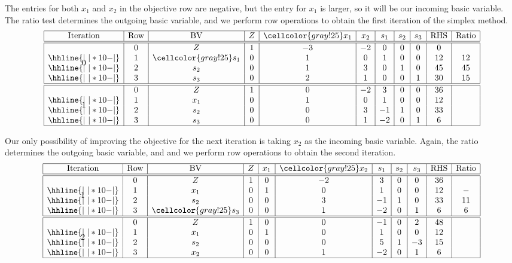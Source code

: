\documentclass[12pt]{article}
\theoremstyle{definition}
\begin{document}
The entries for both $x_1$ and $x_2$ in the objective row are negative, but the entry for $x_1$ is larger, so it will be our incoming basic variable. The ratio test determines the outgoing basic variable, and we perform row operations to obtain the first iteration of the simplex method.
\[\begin{array}{*{11}{|c}|}
    \hline
    \text{Iteration} & \text{Row} & \text{BV} & Z & \cellcolor{gray!25} x_1 & x_2 & s_1 & s_2 & s_3 & \text{RHS} & \text{Ratio} \\\hline\hline
    \multirow{4}*{0}
    & 0 & Z   & 1 & -3 & -2 & 0 & 0 & 0 & 0  &    \\\hhline{|~|*{10}{-}|}
    & 1 & \cellcolor{gray!25}s_1 & 0 & 1  & 0  & 1 & 0 & 0 & 12 & 12 \\\hhline{|~|*{10}{-}|}
    & 2 & s_2 & 0 & 1  & 3  & 0 & 1 & 0 & 45 & 45 \\\hhline{|~|*{10}{-}|}
    & 3 & s_3 & 0 & 2  & 1  & 0 & 0 & 1 & 30 & 15 \\\hline
    \hline
    \multirow{4}*{1}
    & 0 & Z   & 1 & 0 & -2 & 3 & 0 & 0 & 36  & \\\hhline{|~|*{10}{-}|}
    & 1 & x_1 & 0 & 1  & 0  & 1 & 0 & 0 & 12 &  \\\hhline{|~|*{10}{-}|}
    & 2 & s_2 & 0 &  0 & 3  & -1 & 1 & 0 & 33 &  \\\hhline{|~|*{10}{-}|}
    & 3 & s_3 & 0 & 0  & 1  & -2 & 0 & 1 & 6 &  \\\hline
\end{array}\]

Our only possibility of improving the objective for the next iteration is taking $x_2$ as the incoming basic variable. Again, the ratio determines the outgoing basic variable, and and we perform row operations to obtain the second iteration.
\[\begin{array}{*{11}{|c}|}
    \hline
    \text{Iteration} & \text{Row} & \text{BV} & Z & x_1 & \cellcolor{gray!25}x_2 & s_1 & s_2 & s_3 & \text{RHS} & \text{Ratio} \\\hline\hline
    \multirow{4}*{1}
    & 0 & Z   & 1 & 0  & -2 & 3  & 0 & 0 & 36 &  \\\hhline{|~|*{10}{-}|}
    & 1 & x_1 & 0 & 1  & 0  & 1  & 0 & 0 & 12 &  - \\\hhline{|~|*{10}{-}|}
    & 2 & s_2 & 0 &  0 & 3  & -1 & 1 & 0 & 33 & 11 \\\hhline{|~|*{10}{-}|}
    & 3 & \cellcolor{gray!25}s_3 & 0 & 0  & 1  & -2 & 0 & 1 & 6  & 6 \\\hline
    \hline
    \multirow{4}*{2}
    & 0 & Z   & 1 & 0  & 0 & -1  & 0 & 2 & 48 & \\\hhline{|~|*{10}{-}|}
    & 1 & x_1 & 0 & 1  & 0  & 1  & 0 & 0 & 12 & \\\hhline{|~|*{10}{-}|}
    & 2 & s_2 & 0 &  0 & 0  & 5 & 1 & -3 & 15 & \\\hhline{|~|*{10}{-}|}
    & 3 & x_2 & 0 & 0  & 1  & -2 & 0 & 1 & 6  & \\\hline
\end{array}\]
\end{document}
